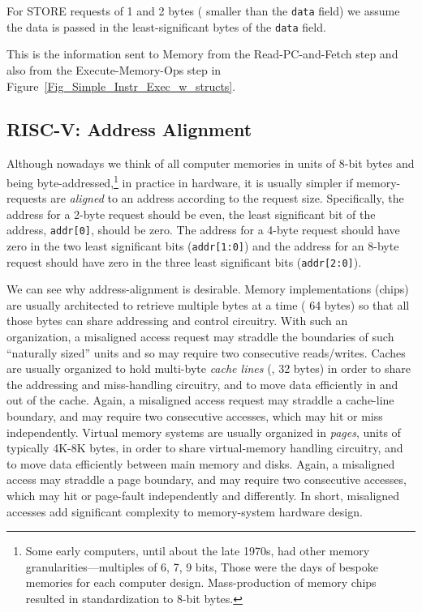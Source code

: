 For STORE requests of 1 and 2 bytes ({\ie} smaller than the \verb|data|
field) we assume the data is passed in the least-significant bytes of
the \verb|data| field.

This is the information sent to Memory from the Read-PC-and-Fetch step
and also from the Execute-Memory-Ops step in
Figure~\ref{Fig_Simple_Instr_Exec_w_structs}.


\subsection{RISC-V: Address Alignment}


Although nowadays we think of all computer memories in units of 8-bit
bytes and being byte-addressed,\footnote{Some early computers, until
about the late 1970s, had other memory granularities---multiples of 6,
7, 9 bits, {\etc} Those were the days of bespoke memories for each
computer design.  Mass-production of memory chips resulted in
standardization to 8-bit bytes.} in practice in hardware, it is
usually simpler if memory-requests are \emph{aligned} to an address
according to the request size.  Specifically, the address for a 2-byte
request should be even, {\ie} the least significant bit of the
address, \verb|addr[0]|, should be zero.  The address for a 4-byte
request should have zero in the two least significant bits
(\verb|addr[1:0]|) and the address for an 8-byte request should have
zero in the three least significant bits (\verb|addr[2:0]|).

We can see why address-alignment is desirable.  Memory implementations
(chips) are usually architected to retrieve multiple bytes at a time
({\eg} 64 bytes) so that all those bytes can share addressing and
control circuitry.  With such an organization, a misaligned access
request may straddle the boundaries of such ``naturally sized'' units
and so may require two consecutive reads/writes.  Caches are usually
organized to hold multi-byte \emph{cache lines} ({\eg}, 32 bytes) in
order to share the addressing and miss-handling circuitry, and to move
data efficiently in and out of the cache.  Again, a misaligned access
request may straddle a cache-line boundary, and may require two
consecutive accesses, which may hit or miss independently.  Virtual
memory systems are usually organized in \emph{pages}, units of
typically 4K-8K bytes, in order to share virtual-memory handling
circuitry, and to move data efficiently between main memory and disks.
Again, a misaligned access may straddle a page boundary, and may
require two consecutive accesses, which may hit or page-fault
independently and differently.  In short, misaligned accesses add
significant complexity to memory-system hardware design.

